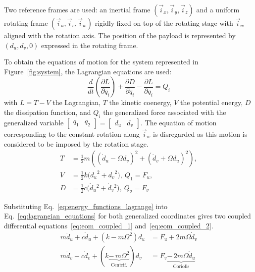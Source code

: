 \documentclass[10pt]{iopart}
\begin{document}
Two reference frames are used: an inertial frame \((\vec{i}_x, \vec{i}_y, \vec{i}_z)\) and a uniform rotating frame \((\vec{i}_u, \vec{i}_v, \vec{i}_w)\) rigidly fixed on top of the rotating stage with \(\vec{i}_w\) aligned with the rotation axis.
The position of the payload is represented by \((d_u, d_v, 0)\) expressed in the rotating frame.

\par
To obtain the equations of motion for the system represented in Figure~\ref{fig:system}, the Lagrangian equations are used:
\begin{equation}
\label{eq:lagrangian_equations}
  \frac{d}{dt} \left( \frac{\partial L}{\partial \dot{q}_i} \right) + \frac{\partial D}{\partial \dot{q}_i} - \frac{\partial L}{\partial q_i} = Q_i
\end{equation}
with \(L = T - V\) the Lagrangian, \(T\) the kinetic coenergy, \(V\) the potential energy, \(D\) the dissipation function, and \(Q_i\) the generalized force associated with the generalized variable \(\begin{bmatrix}q_1 & q_2\end{bmatrix} = \begin{bmatrix}d_u & d_v\end{bmatrix}\).
The equation of motion corresponding to the constant rotation along \(\vec{i}_w\) is disregarded as this motion is considered to be imposed by the rotation stage.
\begin{equation}
\label{eq:energy_functions_lagrange}
  \begin{aligned}
    T &= \frac{1}{2} m \left( ( \dot{d}_u - \Omega d_v )^2 + ( \dot{d}_v + \Omega d_u )^2 \right), \\
    V &= \frac{1}{2} k \big( {d_u}^2 + {d_v}^2 \big), \ Q_1 = F_u, \\
    D &= \frac{1}{2} c \big( \dot{d}_u{}^2 + \dot{d}_v{}^2 \big), \ Q_2 = F_v
  \end{aligned}
\end{equation}

Substituting Eq.~\eqref{eq:energy_functions_lagrange} into Eq.~\eqref{eq:lagrangian_equations} for both generalized coordinates gives two coupled differential equations~\eqref{eq:eom_coupled_1} and~\eqref{eq:eom_coupled_2}.
\begin{subequations}
\label{eq:eom_coupled}
  \begin{align}
    m \ddot{d}_u + c \dot{d}_u + ( k - m \Omega^2 ) d_u &= F_u + 2 m \Omega \dot{d}_v \label{eq:eom_coupled_1} \\
    m \ddot{d}_v + c \dot{d}_v + ( k \underbrace{-\,m \Omega^2}_{\text{Centrif.}} ) d_v &= F_v \underbrace{-\,2 m \Omega \dot{d}_u}_{\text{Coriolis}} \label{eq:eom_coupled_2}
  \end{align}
\end{subequations}
\end{document}

